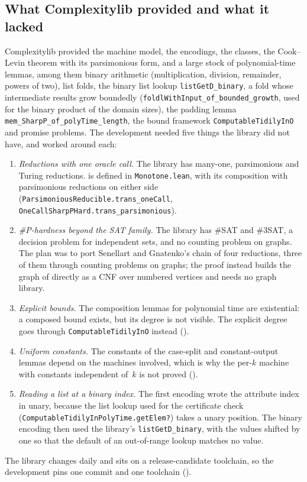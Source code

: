 \documentclass[pdflatex,sn-mathphys-num]{sn-jnl}
\theoremstyle{thmstyleone}
\theoremstyle{thmstylethree}
\begin{document}
\subsection{What Complexitylib provided and what it lacked}
\label{sec:gaps}

Complexitylib provided the machine model, the encodings, the classes, the Cook--Levin theorem
with its parsimonious form, and a large stock of polynomial-time lemmas, among them binary
arithmetic (multiplication, division, remainder, powers of two), list folds, the binary list
lookup \lstinline{listGetD_binary}, a fold whose intermediate results grow boundedly
(\lstinline{foldlWithInput_of_bounded_growth}, used for the binary product of the domain sizes),
the padding lemma \lstinline{mem_SharpP_of_polyTime_length}, the bound framework
\lstinline{ComputableTidilyInO} and promise problems. The development needed five things the
library did not have, and worked around each:
\begin{enumerate}
\item \emph{Reductions with one oracle call.} The library has many-one, parsimonious and
  Turing reductions.  is defined in \texttt{Monotone.lean}, with its
  composition with parsimonious reductions on either side
  (\lstinline{ParsimoniousReducible.trans_oneCall},
  \lstinline{OneCallSharpPHard.trans_parsimonious}).
\item \emph{\#P-hardness beyond the SAT family.} The library has \#SAT and \#3SAT, a decision
  problem for independent sets, and no counting problem on graphs. The plan was to port
  Senellart and Gnatenko's chain of four reductions, three of them through counting problems on
  graphs; the
  proof instead builds the graph of  directly as a CNF over numbered vertices
  and needs no graph library.
\item \emph{Explicit bounds.} The composition lemmas for polynomial time are existential: a
  composed bound exists, but its degree is not visible. The explicit degree goes through
  \lstinline{ComputableTidilyInO} instead ().
\item \emph{Uniform constants.} The constants of the case-split and constant-output lemmas depend
  on the machines involved, which is why the per-$k$ machine with constants independent of~$k$
  is not proved ().
\item \emph{Reading a list at a binary index.} The first encoding wrote the attribute index in
  unary, because the list lookup used for the certificate check
  (\lstinline{ComputableTidilyInPolyTime.getElem?}) takes a unary position. The binary encoding
  then used the library's \lstinline{listGetD_binary}, with the values shifted by one so that
  the default of an out-of-range lookup matches no value.
\end{enumerate}
The library changes daily and sits on a release-candidate toolchain, so the development pins
one commit and one toolchain ().
\end{document}
